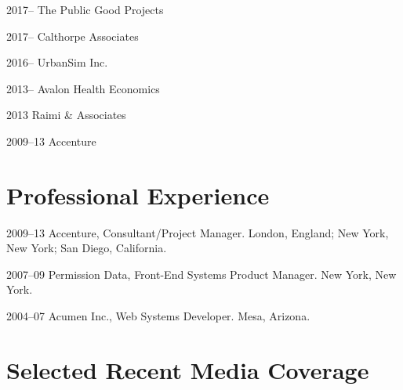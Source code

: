 \documentclass{academiccv}
\begin{document}
\begin{tablist}

\item[2017--]   \tab The Public Good Projects	

\item[2017--]   \tab Calthorpe Associates

\item[2016--]   \tab UrbanSim Inc.

\item[2013--]   \tab Avalon Health Economics

\item[2013]     \tab Raimi \& Associates

\item[2009--13] \tab Accenture

\end{tablist}



\section*{Professional Experience}

\begin{tablist}
	
\item[2009--13] \tab Accenture, Consultant/Project Manager. London, England; New York, New York; San Diego, California.

\item[2007--09] \tab Permission Data, Front-End Systems Product Manager. New York, New York.

\item[2004--07] \tab Acumen Inc., Web Systems Developer. Mesa, Arizona.

\end{tablist}



\section*{Selected Recent Media Coverage}
\end{document}
